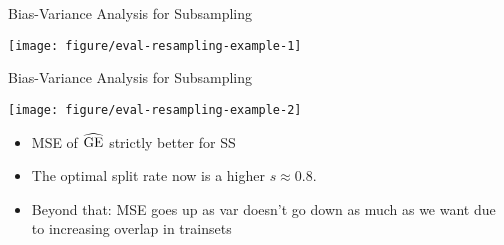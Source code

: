 \begin{frame}{Bias-Variance Analysis for Subsampling}
\begin{center}
\texttt{[image: figure/eval-resampling-example-1]}
\end{center}

\vfill




\end{frame}


\begin{vbframe}{Bias-Variance Analysis for Subsampling}

\begin{center}
\texttt{[image: figure/eval-resampling-example-2]}
\end{center}

\begin{itemize}
  \item MSE of $\widehat{\mathrm{GE}}$ strictly better for SS
  \item The optimal split rate now is a higher $s \approx 0.8$.
  \item Beyond that: MSE goes up as var doesn't go down as much as we want 
      due to increasing overlap in trainsets
\end{itemize}

\end{vbframe}

